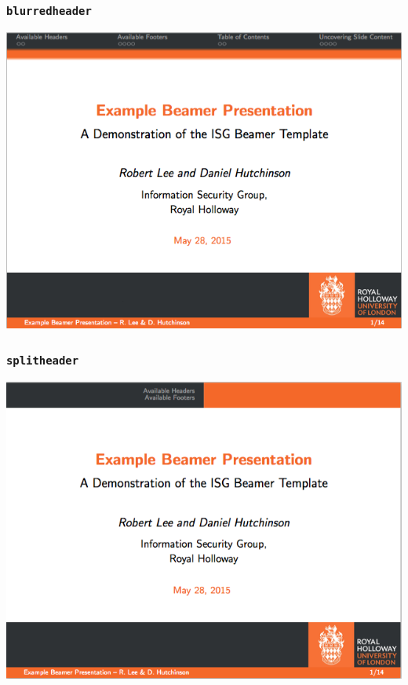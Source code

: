\documentclass{beamer}
\begin{document}
\begin{frame}\frametitle{\texttt{blurredheader}}
\begin{center}
	\includegraphics[scale=0.4]{graphics/blurredheader.png}
\end{center}
\end{frame}

\begin{frame}\frametitle{\texttt{splitheader}}
\begin{center}
	\includegraphics[scale=0.4]{graphics/splitheader.png}
\end{center}
\end{frame}
\end{document}
